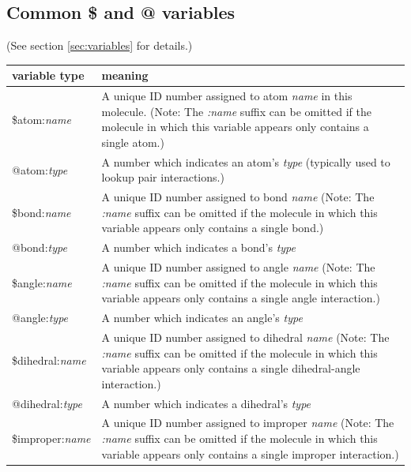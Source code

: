 \documentclass[11pt]{article}
\begin{document}



\subsection{Common \$ and @ variables}

(See section \ref{sec:variables} for details.) \\
\begin{tabular}[h]{l|p{11cm}}
\textbf{variable type} & \textbf{meaning}
\\
\hline
\hline
\$atom:\textit{name}  &
A unique ID number assigned to atom \textit{name} in this molecule. 
(Note: The \textit{:name} suffix can be omitted if the molecule
in which this variable appears only contains a single atom.)
\\
\hline
@atom:\textit{type}   & 
A number which indicates an atom's \textit{type}
               (typically used to lookup pair interactions.)
\\
\hline
\$bond:\textit{name}  & 
A unique ID number assigned to bond \textit{name}
(Note: The \textit{:name} suffix can be omitted if the molecule
in which this variable appears only contains a single bond.)
\\
\hline
@bond:\textit{type}   & 
A number which indicates a bond's \textit{type}
\\
\hline
\$angle:\textit{name}  & 
A unique ID number assigned to angle \textit{name}
(Note: The \textit{:name} suffix can be omitted if the molecule
in which this variable appears only contains a single angle interaction.)
\\
\hline
@angle:\textit{type}   & 
A number which indicates an angle's \textit{type}
\\
\hline
\$dihedral:\textit{name} & 
A unique ID number assigned to dihedral \textit{name}
(Note: The \textit{:name} suffix can be omitted if the molecule in which 
this variable appears only contains a single dihedral-angle interaction.)
\\
\hline
@dihedral:\textit{type}  & 
A number which indicates a dihedral's \textit{type}
\\
\hline
\$improper:\textit{name}  & 
A unique ID number assigned to improper \textit{name}
(Note: The \textit{:name} suffix can be omitted if the molecule in which 
this variable appears only contains a single improper interaction.)

\end{tabular}
\end{document}
